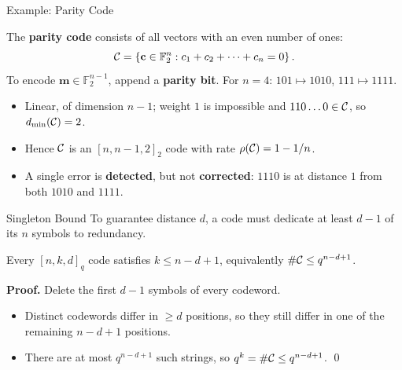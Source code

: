 \documentclass{zkdl-presentation-template}
\begin{document}
    \begin{frame}{Example: Parity Code}
        \begin{example}
            The \textbf{parity code} consists of all vectors with an even number of ones:
            \begin{equation*}
                \mathcal{C} = \left\{ \mathbf{c} \in \mathbb{F}_2^n : c_1 + c_2 + \dots + c_n = 0 \right\}.
            \end{equation*}
            To encode $\mathbf{m} \in \mathbb{F}_2^{n-1}$, append a \textbf{parity bit}. For $n = 4$: $101 \mapsto 1010$, $111 \mapsto 1111$.
        \end{example}
        \pause

        \begin{itemize}
            \item Linear, of dimension $n-1$; weight $1$ is impossible and $110\ldots0 \in \mathcal{C}$, so $d_{\min}(\mathcal{C}) = 2$.\pause
            \item Hence $\mathcal{C}$ is an $[n, n-1, 2]_2$ code with rate $\rho(\mathcal{C}) = 1 - 1/n$.\pause
            \item A single error is \textbf{detected}, but not \textbf{corrected}: $1110$ is at distance $1$ from both $1010$ and $1111$.
        \end{itemize}
    \end{frame}

    \begin{frame}{Singleton Bound}
        To guarantee distance $d$, a code must dedicate at least $d-1$ of its $n$ symbols to redundancy.

        \begin{proposition}
            Every $[n,k,d]_q$ code satisfies $k \leq n-d+1$, equivalently $\#\mathcal{C} \leq q^{n-d+1}$.
        \end{proposition}
        \pause

        \textbf{Proof.} Delete the first $d-1$ symbols of every codeword.
        \begin{itemize}
            \item Distinct codewords differ in $\geq d$ positions, so they still differ in one of the remaining $n-d+1$ positions.\pause
            \item There are at most $q^{n-d+1}$ such strings, so $q^k = \#\mathcal{C} \leq q^{n-d+1}$. \qed
        \end{itemize}
    \end{frame}
\end{document}
